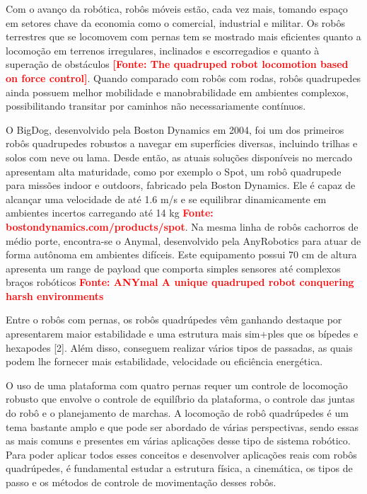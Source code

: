 \documentclass[../main.tex]{subfiles}
\begin{document}
  Com o avanço da robótica, robôs móveis estão, cada vez mais, tomando espaço em setores chave da economia como o comercial, industrial e militar. Os robôs terrestres que se locomovem com pernas tem se mostrado mais eficientes quanto a locomoção em terrenos irregulares, inclinados e escorregadios e quanto à superação de obstáculos \textbf{\textcolor{red}{[Fonte: The quadruped robot locomotion based on force control]}}.  Quando comparado com robôs com rodas, robôs quadrupedes ainda possuem melhor mobilidade e manobrabilidade em ambientes complexos, possibilitando transitar por caminhos não necessariamente contínuos.
          
  O BigDog, desenvolvido pela Boston Dynamics em 2004, foi um dos primeiros robôs quadrupedes  robustos a navegar em superfícies diversas, incluindo trilhas e solos com neve ou lama. Desde então, as atuais soluções disponíveis no mercado apresentam alta maturidade, como por exemplo o Spot, um robô quadrupede para missões indoor e outdoors, fabricado pela Boston Dynamics. Ele é capaz de alcançar uma velocidade de até 1.6 m/s e se equilibrar dinamicamente em ambientes incertos carregando até 14 kg \textbf{\textcolor{red}{Fonte: bostondynamics.com/products/spot}}.  Na mesma linha de robôs cachorros de médio porte, encontra-se o Anymal, desenvolvido pela AnyRobotics para atuar de forma autônoma em ambientes difíceis. Este equipamento possui 70 cm de altura apresenta um range de payload que comporta simples sensores até complexos braços robóticos \textbf{\textcolor{red}{Fonte: ANYmal A unique quadruped robot conquering harsh environments}}

  Entre o robôs com pernas, os robôs quadrúpedes vêm ganhando destaque por apresentarem maior estabilidade e uma estrutura mais sim+ples que os bípedes e hexapodes [2]. Além disso, conseguem realizar vários tipos de passadas, as quais podem lhe fornecer mais estabilidade, velocidade ou eficiência energética. 

  O uso de uma plataforma com quatro pernas requer um controle de locomoção robusto que envolve o controle de equilíbrio da plataforma, o controle das juntas do robô e o planejamento de marchas. A locomoção de robô quadrúpedes é um tema bastante amplo e que pode ser abordado de várias perspectivas, sendo essas as mais comuns e presentes em várias aplicações desse tipo de sistema robótico. Para poder aplicar todos esses conceitos e desenvolver aplicações reais com robôs quadrúpedes, é fundamental estudar a estrutura física, a cinemática, os tipos de passo e os métodos de controle de movimentação desses robôs. 
\end{document}
